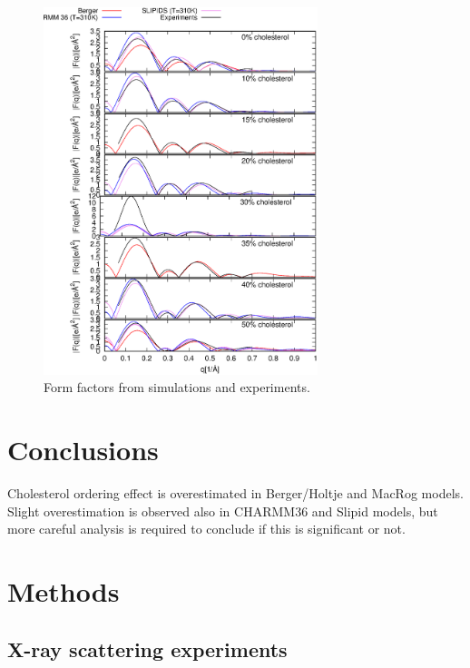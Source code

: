 \documentclass[aps,prl,superscriptaddress,twocolumn]{revtex4}
\begin{document}
 \begin{figure}[]
  \centering
  \includegraphics[width=8cm]{../FIGS/FormFactors.eps}
  \caption{\label{FormFactors}
    Form factors from simulations and experiments.
  }



    
\end{figure}



\section{Conclusions}

Cholesterol ordering effect is overestimated in Berger/Holtje and MacRog models.
Slight overestimation is observed also in CHARMM36 and Slipid models, but more
careful analysis is required to conclude if this is significant or not.


\section{Methods}

\subsection{X-ray scattering experiments}
\end{document}
